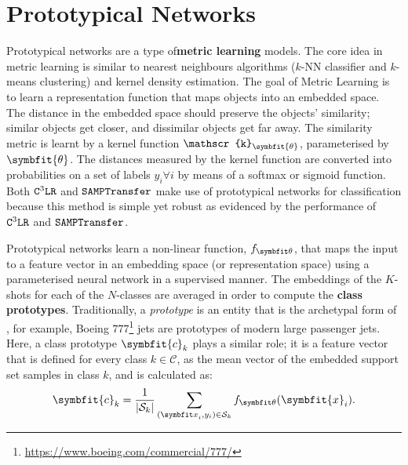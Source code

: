\section{Prototypical Networks}\label{ssec:protonets}

Prototypical networks are a type of\textbf{metric learning} models. The core idea in metric learning is similar to nearest neighbours algorithms ($k$-NN classifier and $k$-means clustering) and kernel density estimation. The goal of Metric Learning is to learn a representation function that maps objects into an embedded space. The distance in the embedded space should preserve the objects' similarity; similar objects get closer, and dissimilar objects get far away. The similarity metric is learnt by a kernel function $\mathscr{k}_{\symbfit{\theta}}$, parameterised by $\symbfit{\theta}$. The distances measured by the kernel function are converted into probabilities on a set of labels $y_i \forall i$ by means of a softmax or sigmoid function. Both $\texttt{C$^3$LR}$ and $\texttt{SAMPTransfer}$ make use of prototypical networks for classification because this method is simple yet robust as evidenced by the performance of $\texttt{C$^3$LR}$ and $\texttt{SAMPTransfer}$.

Prototypical networks learn a non-linear function, $f_{\symbfit \theta}$, that maps the input to a feature vector in an embedding space (or representation space) using a parameterised neural network in a supervised manner. The embeddings of the $K$-shots for each of the $N$-classes are averaged in order to compute the \textbf{class prototypes}. Traditionally, a \textit{prototype} is an entity that is the archetypal form of , for example, Boeing $777$\footnote{\url{https://www.boeing.com/commercial/777/}} jets are prototypes of modern large passenger jets.
Here, a class prototype $\symbfit{c}_k$ plays a similar role; it is a feature vector that is defined for every class $k \in \mathcal{C}$, as the mean vector of the embedded support set samples in class $k$, and is calculated as:
\begin{equation}
    \symbfit{c}_{k}=\frac{1}{|\mcS_{k}|} \sum_{({\symbfit x}_i, y_i) \in {\mcS_k}} f_{\symbfit \theta}(\symbfit{x}_{i}).
    \label{eqn:fsl-proto-calc}
\end{equation}

